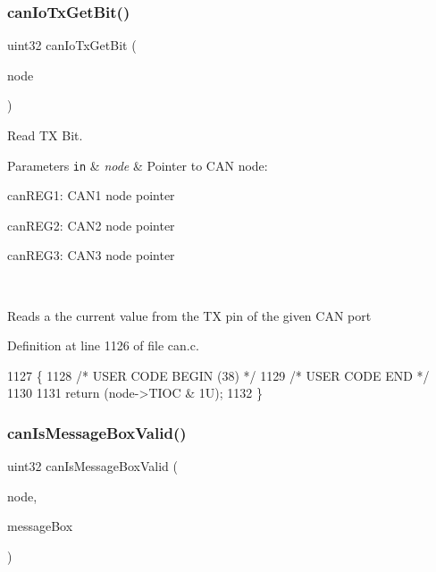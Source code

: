 \subsubsection{\texorpdfstring{can\+Io\+Tx\+Get\+Bit()}{canIoTxGetBit()}}
{\footnotesize\ttfamily uint32 can\+Io\+Tx\+Get\+Bit (\begin{DoxyParamCaption}\item[{\mbox{\hyperlink{reg__can_8h_a54ace0879c28a425474845a63d662c05}{can\+B\+A\+S\+E\+\_\+t}} $\ast$}]{node }\end{DoxyParamCaption})}



Read TX Bit. 


\begin{DoxyParams}[1]{Parameters}
\mbox{\tt in}  & {\em node} & Pointer to C\+AN node\+:
\begin{DoxyItemize}
\item can\+R\+E\+G1\+: C\+A\+N1 node pointer
\item can\+R\+E\+G2\+: C\+A\+N2 node pointer
\item can\+R\+E\+G3\+: C\+A\+N3 node pointer
\end{DoxyItemize}\\
\hline
\end{DoxyParams}
Reads a the current value from the TX pin of the given C\+AN port 

Definition at line 1126 of file can.\+c.


\begin{DoxyCode}
1127 \{
1128 \textcolor{comment}{/* USER CODE BEGIN (38) */}
1129 \textcolor{comment}{/* USER CODE END */}
1130 
1131     \textcolor{keywordflow}{return} (node->TIOC & 1U);
1132 \}
\end{DoxyCode}
\mbox{\label{group__CAN_gae353977bb29792a4297cb4ece4fd7e9c}} 
\subsubsection{\texorpdfstring{can\+Is\+Message\+Box\+Valid()}{canIsMessageBoxValid()}}
{\footnotesize\ttfamily uint32 can\+Is\+Message\+Box\+Valid (\begin{DoxyParamCaption}\item[{\mbox{\hyperlink{reg__can_8h_a54ace0879c28a425474845a63d662c05}{can\+B\+A\+S\+E\+\_\+t}} $\ast$}]{node,  }\item[{uint32}]{message\+Box }\end{DoxyParamCaption})}



